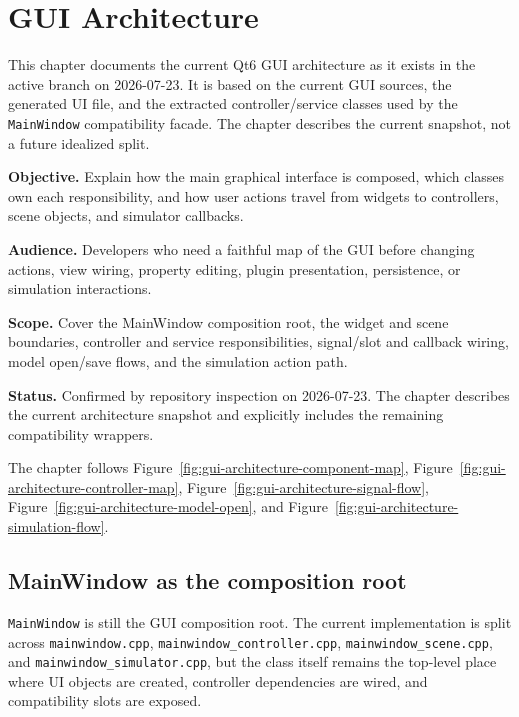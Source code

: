 \chapter{GUI Architecture}
\label{chap:gui-architecture}

This chapter documents the current Qt6 GUI architecture as it exists in the active branch on 2026-07-23. It is based on the current GUI sources, the generated UI file, and the extracted controller/service classes used by the \texttt{MainWindow} compatibility facade. The chapter describes the current snapshot, not a future idealized split.

\noindent\textbf{Objective.} Explain how the main graphical interface is composed, which classes own each responsibility, and how user actions travel from widgets to controllers, scene objects, and simulator callbacks.

\noindent\textbf{Audience.} Developers who need a faithful map of the GUI before changing actions, view wiring, property editing, plugin presentation, persistence, or simulation interactions.

\noindent\textbf{Scope.} Cover the MainWindow composition root, the widget and scene boundaries, controller and service responsibilities, signal/slot and callback wiring, model open/save flows, and the simulation action path.

\noindent\textbf{Status.} Confirmed by repository inspection on 2026-07-23. The chapter describes the current architecture snapshot and explicitly includes the remaining compatibility wrappers.

The chapter follows Figure~\ref{fig:gui-architecture-component-map},
Figure~\ref{fig:gui-architecture-controller-map},
Figure~\ref{fig:gui-architecture-signal-flow},
Figure~\ref{fig:gui-architecture-model-open},
and Figure~\ref{fig:gui-architecture-simulation-flow}.

\section{MainWindow as the composition root}
\label{sec:gui-architecture-mainwindow}

\texttt{MainWindow} is still the GUI composition root. The current implementation is split across \texttt{mainwindow.cpp}, \texttt{mainwindow\_controller.cpp}, \texttt{mainwindow\_scene.cpp}, and \texttt{mainwindow\_simulator.cpp}, but the class itself remains the top-level place where UI objects are created, controller dependencies are wired, and compatibility slots are exposed.

